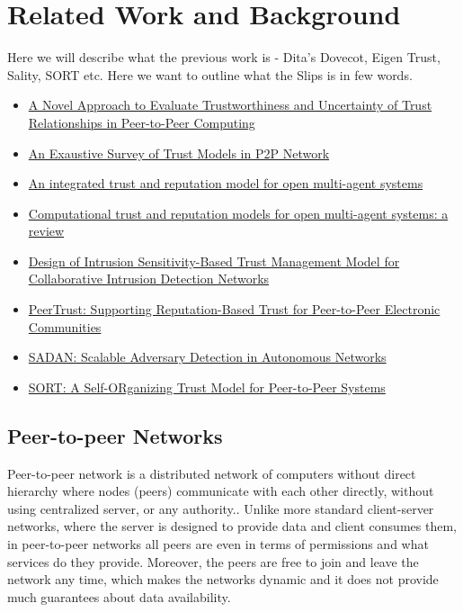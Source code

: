 \chapter{Related Work and Background}
\label{ch:related-work-background}

Here we will describe what the previous work is - Dita's Dovecot, Eigen Trust, Sality, SORT etc.
Here we want to outline what the Slips is in few words.

\begin{itemize}
    \item \href{https://share.goodnotes.com/s/60IVzs1mgmuPWF54Us5eKA}{A Novel Approach to Evaluate Trustworthiness and Uncertainty of Trust Relationships in Peer-to-Peer Computing} 
    \item \href{https://share.goodnotes.com/s/7AFjiqAqJSCF1en3vt4vjS}{An Exaustive Survey of Trust Models in P2P Network}
    \item \href{https://share.goodnotes.com/s/EziqqW185BzxHxNrZ6d1MQ}{An integrated trust and reputation model for open multi-agent systems}
    \item \href{https://share.goodnotes.com/s/MRfXxmu2Lz51IqK7JODn1N}{Computational trust and reputation models for open multi-agent systems: a review}
    \item \href{https://share.goodnotes.com/s/tafBG1KUZCuYT2E7a3ucc9}{Design of Intrusion Sensitivity-Based Trust Management Model for Collaborative Intrusion Detection Networks}
    \item \href{https://share.goodnotes.com/s/YQuoXUbYADa15Hwe90sXCM}{ PeerTrust: Supporting Reputation-Based Trust for Peer-to-Peer Electronic Communities}
    \item \href{https://share.goodnotes.com/s/hRHxSYlk6wU4BEn6u9Jcyu}{SADAN: Scalable Adversary Detection in Autonomous Networks}
    \item \href{https://share.goodnotes.com/s/bXWUbVFi5qBiAdBmJ4yYAx}{SORT: A Self-ORganizing Trust Model for Peer-to-Peer Systems}
\end{itemize}


\section{Peer-to-peer Networks}
\label{sec:peer-to-peer-networks}
Peer-to-peer network is a distributed network of computers without direct hierarchy where nodes (peers) communicate with each other directly, without using centralized server, or any authority.\cite{schollmeier}.
Unlike more standard client-server networks, where the server is designed to provide data and client consumes them, in peer-to-peer networks all peers are even in terms of permissions and what services do they provide.
Moreover, the peers are free to join and leave the network any time, which makes the networks dynamic and it does not provide much guarantees about data availability.


